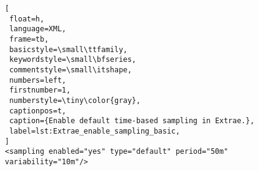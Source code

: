 \begin{lstlisting}[
 float=h,
 language=XML,
 frame=tb,
 basicstyle=\small\ttfamily,
 keywordstyle=\small\bfseries,
 commentstyle=\small\itshape,
 numbers=left,
 firstnumber=1,
 numberstyle=\tiny\color{gray},
 captionpos=t,
 caption={Enable default time-based sampling in Extrae.},
 label=lst:Extrae_enable_sampling_basic,
]
<sampling enabled="yes" type="default" period="50m" variability="10m"/>
\end{lstlisting}
